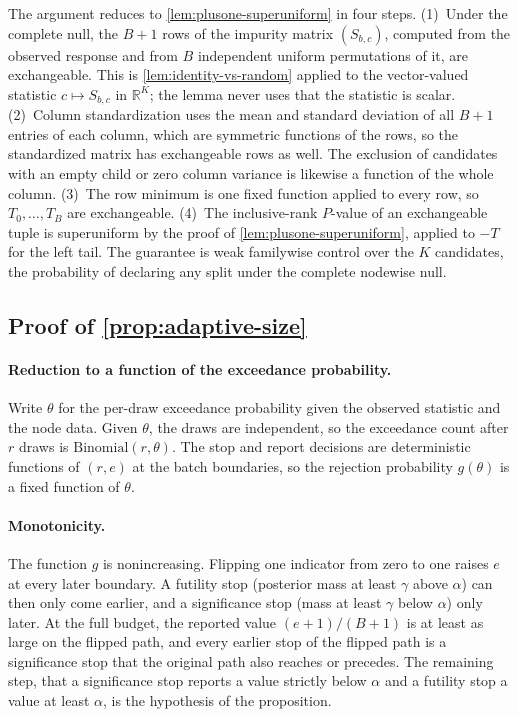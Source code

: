 The argument reduces to \cref{lem:plusone-superuniform} in four steps.
(1)~Under the complete null, the $B+1$ rows of the impurity matrix
$(S_{b,c})$, computed from the observed response and from $B$ independent
uniform permutations of it, are exchangeable. This is
\cref{lem:identity-vs-random} applied to the vector-valued statistic
$c \mapsto S_{b,c}$ in $\mathbb{R}^{K}$; the lemma never uses that the statistic
is scalar. (2)~Column standardization uses the mean and standard deviation of
all $B+1$ entries of each column, which are symmetric functions of the rows, so
the standardized matrix has exchangeable rows as well. The exclusion of
candidates with an empty child or zero column variance is likewise a function of
the whole column. (3)~The row minimum is one fixed function applied to every
row, so $T_0,\dots,T_B$ are exchangeable. (4)~The inclusive-rank $P$-value of an
exchangeable tuple is superuniform by the proof of
\cref{lem:plusone-superuniform}, applied to $-T$ for the left tail. The
guarantee is weak familywise control over the $K$ candidates, the probability
of declaring any split under the complete nodewise null.

\subsection{Proof of \texorpdfstring{\cref{prop:adaptive-size}}{Proposition 1}}
\label{app:proof-adaptive}

\paragraph{Reduction to a function of the exceedance probability.} Write
$\theta$ for the per-draw exceedance probability given the observed statistic
and the node data. Given $\theta$, the draws are independent, so the exceedance
count after $r$ draws is $\mathrm{Binomial}(r,\theta)$. The stop and report
decisions are deterministic functions of $(r,e)$ at the batch boundaries, so the
rejection probability $g(\theta)$ is a fixed function of $\theta$.

\paragraph{Monotonicity.} The function $g$ is nonincreasing. Flipping one
indicator from zero to one raises $e$ at every later boundary. A futility stop
(posterior mass at least $\gamma$ above $\alpha$) can then only come earlier, and
a significance stop (mass at least $\gamma$ below $\alpha$) only later. At the full
budget, the reported value $(e+1)/(B+1)$ is at least as large on the flipped
path, and every earlier stop of the flipped path is a significance stop that
the original path also reaches or precedes. The remaining step, that a significance stop
reports a value strictly below $\alpha$ and a futility stop a value at least
$\alpha$, is the hypothesis of the proposition.

